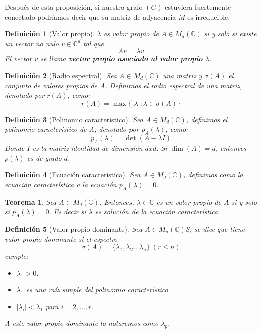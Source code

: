 \documentclass[size=a4, parskip=half, titlepage=false, toc=flat, toc=bib, 12pt]{scrartcl}
\theoremstyle{theorem-style}
\newtheorem{nth}{Teorema}[section]
\theoremstyle{definition-style}
\newtheorem{ndef}{Definición}[section]
\theoremstyle{remark-style}
\theoremstyle{example-style}
\theoremstyle{definition-style}
\theoremstyle{remark-style}
\begin{document}
Después de esta proposición, si nuestro grafo $(G)$ estuviera fuertemente conectado podríamos decir que su matriz de adyacencia $M$ es irreducible.

\begin{ndef}[Valor propio]
$\lambda$ es valor propio de $A \in M_d(\mathbb{C})$ si y solo si existe un vector no nulo $v \in \mathbb{C}^d$ tal que
$$Av = \lambda v$$
El vector $v$ se llama \textbf{vector propio asociado al valor propio} $\lambda$.
\end{ndef}

\begin{ndef}[Radio espectral]
Sea $A \in M_d(\mathbb{C})$ una matriz y $\sigma (A)$ el conjunto de valores propios de $A$. Definimos el radio espectral de una matriz, denotado por $r(A)$,  como:
$$r(A) = \max \{ | \lambda| : \lambda \in \sigma (A) \} $$
\end{ndef}

\begin{ndef}[Polinomio característico]
Sea $A \in M_d(\mathbb{C})$, definimos el polinomio característico de A, denotado por $p_A(\lambda)$, como:
$$p_A(\lambda) = \det (A - \lambda I) $$
Donde $I$ es la matriz identidad de dimensión $dxd$. Si $\dim(A) = d$, entonces $p(\lambda)$ es de grado $d$.
\end{ndef}
\begin{ndef}[Ecuación característica]
Sea $A \in M_d(\mathbb{C})$, definimos como la ecuación característica a la ecuación $p_A(\lambda) = 0$.
\end{ndef}

\begin{nth}
Sea $A \in M_d(\mathbb{C})$. Entonces, $\lambda \in \mathbb{C}$ es un valor propio de $A$ si y solo si $p_A(\lambda) = 0$. Es decir si $\lambda$ es solución de la ecuación característica.
\end{nth}

\begin{ndef}[Valor propio dominante]
Sea $A \in M_n(\mathbb{C})$S, se dice que tiene valor propio dominante si el espectro
$$\sigma (A) = \{ \lambda_1, \lambda_2 \dots \lambda_n \} \   (r \leq n)$$
cumple:
\begin{itemize}
\item $\lambda_1 > 0$.
\item $\lambda_1$ es una raíz simple del polinomio característico
\item $|\lambda_i| < \lambda_1$ para $i = 2, \dots , r$.
\end{itemize}
A este valor propio dominante lo notaremos como $\lambda_p$.
\end{ndef}
\end{document}
